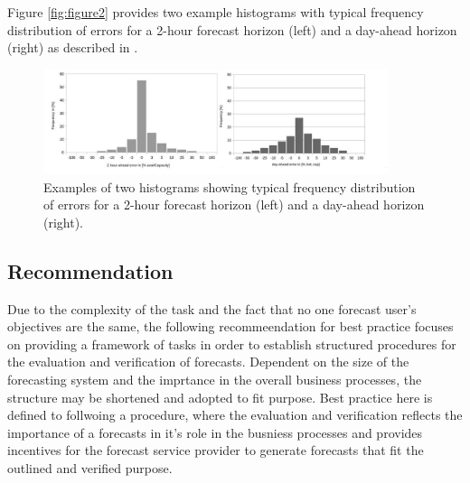 Figure  \ref{fig:figure2} provides two example histograms with typical frequency distribution of errors for a 2-hour forecast horizon (left) and a day-ahead horizon (right) as described in \cite{madsen2005}.

\begin{figure}[h]
\includegraphics[width=0.9\textwidth]{figures/freq2plots.jpg}
\caption{Examples of two histograms showing typical frequency distribution of errors for a 2-hour forecast horizon (left) and a day-ahead horizon (right). }
\label{fig:freqency}
\end{figure}


\subsection{Recommendation}

Due to the complexity of the task and the fact that no one forecast user's objectives are the same, the following recommeendation for best practice focuses on providing a framework of tasks in order to establish structured procedures for the evaluation and verification of forecasts. Dependent on the size of the forecasting system and the imprtance in the overall business processes, the structure may be shortened and adopted to fit purpose.
Best practice here is defined to follwoing a procedure, where the evaluation and verification reflects the importance of a forecasts in it's role in the busniess processes and provides incentives for the forecast service provider to generate forecasts that fit the outlined and verified purpose. 

